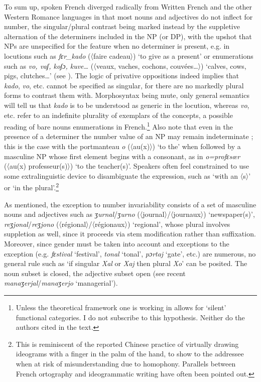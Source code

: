 \documentclass[output=paper]{langscibook}
\begin{document}
To sum up, spoken French diverged radically from Written French and the other Western Romance languages in that most nouns and adjectives do not inflect for number, the singular/plural contrast being marked instead by the suppletive alternation of the determiners included in the NP (or DP), with the upshot that NPs are unspecified for the feature when no determiner is present, e.g. in locutions such as  \textit{fɛr\_kado} (〈faire cadeau〉) ‘to give as a present’ or enumerations such as \textit{vo, vaʃ, koʃɔ, kuve…} (〈veaux, vaches, cochons, couvées…〉) ‘calves, cows, pigs, clutches…’ (see \citealt{TasmowskiLaca2021}). The logic of privative oppositions indeed implies that \textit{kado}, \textit{vo}, etc. cannot be specified as singular, for there are no markedly plural forms to contrast them with. Morphosyntax being mute, only general semantics will tell us that \textit{kado} is to be understood as generic in the locution, whereas \textit{vo}, etc. refer to an indefinite plurality of exemplars of the concepts, a possible reading of bare nouns enumerations in French.\footnote{Unless the theoretical framework one is working in allows for ‘silent’ functional categories. I do not subscribe to this hypothesis. Neither do the authors cited in the text.} Also note that even in the presence of a determiner the number value of an NP may remain indeterminate ; this is the case with the portmanteau \textit{o} (〈au(x)〉) ‘to the’ when followed by a masculine NP whose first element begins with a consonant, as in \textit{o=profɛsœr} (〈au(x) professeur(s)〉) ‘to the teacher(s)’. Speakers often feel constrained to use some extralinguistic device to disambiguate the expression, such as ‘with an 〈s〉’ or ‘in the plural’.\footnote{This is reminiscent of the reported Chinese practice of virtually drawing ideograms with a finger in the palm of the hand, to show to the addressee when at risk of misunderstanding due to homophony. Parallels between French ortography and ideogrammatic writing have often been pointed out.}

As mentioned, the exception to number invariability consists of a set of masculine nouns and adjectives such as \textit{ʒurnal}\slash\textit{ʒurno} (〈journal〉\slash 〈journaux〉) ‘newspaper(s)’, \textit{reʒjonal}\slash\textit{reʒjono} (〈régional〉\slash 〈régionaux〉) ‘regional’, whose plural involves suppletion as well, since it proceeds via stem modification rather than suffixation. Moreover, since gender must be taken into account and exceptions to the exception (e.g. \textit{fɛstival} ‘festival’, \textit{tonal} ‘tonal’, \textit{pɔrtaj} ‘gate’, etc.) are numerous, no general rule such as ‘if singular \textit{Xal} or \textit{Xaj} then plural \textit{Xo}’ can be posited. The noun subset is closed, the adjective subset open (see recent \textit{manaʒerjal}\slash\textit{manaʒerjo} ‘managerial’).
\end{document}
